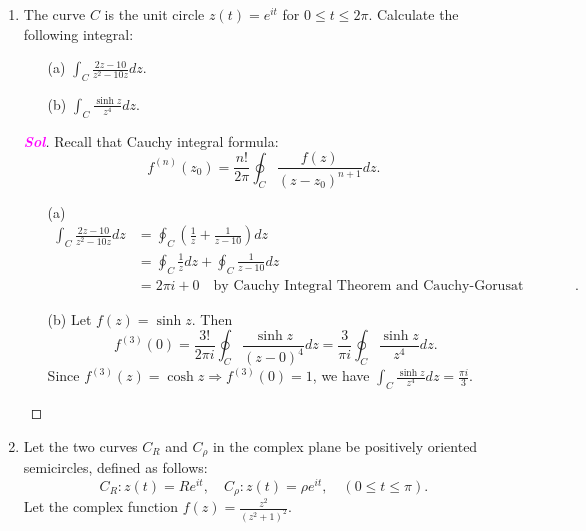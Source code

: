 \documentclass{article}
\theoremstyle{definition}
\newcommand{\of}[1]{\left( #1 \right)}
\newcommand{\sol}{\textcolor{magenta}{\bf Sol}}
\renewcommand{\Re}{\operatorname{Re}}
\renewcommand{\Im}{\operatorname{Im}}
\begin{document}
\begin{enumerate}
	\newpage
	\item The curve $C$ is the unit circle $z(t) = e^{it}$ for $0\leq t\leq 2\pi$. Calculate the following integral: \begin{enumerate}
		\item[(a)] $\displaystyle\int_C\frac{2z-10}{z^2-10z}dz$.
		\vspace{4pt}
		\item[(b)] $\displaystyle\int_C\frac{\sinh z}{z^4}dz$.
	\end{enumerate}
	\begin{proof}[\sol]
		Recall that Cauchy integral formula: \[
		f^{(n)}(z_0)=\frac{n!}{2\pi}\oint_C\frac{f\of{z}}{\of{z-z_0}^{n+1}}dz.
		\]
		\begin{itemize}
			\item[(a)] \begin{align*}
				\int_C\frac{2z-10}{z^2-10z}dz&=\oint_C\of{\frac{1}{z}+\frac{1}{z-10}}dz\\
				&=\oint_C\frac{1}{z}dz+\oint_C\frac{1}{z-10}dz\\
				&=2\pi i+0\quad\text{by Cauchy Integral Theorem and Cauchy-Gorusat Theorem}.
			\end{align*}
			\item[(b)] Let $f\of{z}=\sinh z$. Then \[
			f^{(3)}(0)=\frac{3!}{2\pi i}\oint_C\frac{\sinh z}{(z-0)^4}dz=\frac{3}{\pi i}\oint_C\frac{\sinh z}{z^4}dz.
			\] Since $f^{(3)}(z)=\cosh z\Rightarrow f^{(3)}(0)=1$, we have $\displaystyle\int_C\frac{\sinh z}{z^4}dz=\frac{\pi i}{3}$.
		\end{itemize}
	\end{proof}
	\vspace{8pt}
	\item Let the two curves $C_R$ and $C_\rho$ in the complex plane be positively oriented semicircles, defined as follows:
	\[
	C_R: z(t) = Re^{it},\quad  C_\rho: z(t) = \rho e^{it},\quad \of{0\leq t\leq\pi}.
	\] Let the complex function $\displaystyle f(z) = \frac{z^2}{\of{z^2+1}^2}$. 
	\begin{center}
\end{center}
\end{enumerate}
\end{document}
